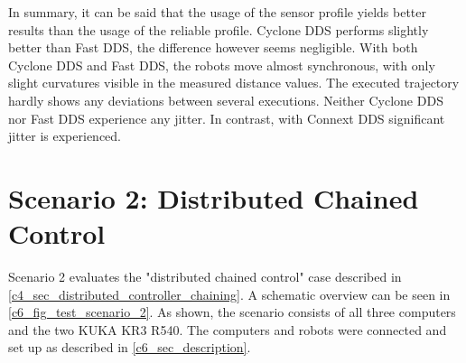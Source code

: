 In summary, it can be said that the usage of the sensor profile yields better results than the usage of the reliable profile. Cyclone DDS performs slightly better than Fast DDS, the difference however seems negligible. With both Cyclone DDS and Fast DDS, the robots move almost synchronous, with only slight curvatures visible in the measured distance values. The executed trajectory hardly shows any deviations between several executions. Neither Cyclone DDS nor Fast DDS experience any jitter. In contrast, with Connext DDS significant jitter is experienced.


\section{Scenario 2: Distributed Chained Control}
Scenario 2 evaluates the "distributed chained control" case described in \autoref{c4_sec_distributed_controller_chaining}. A schematic overview can be seen in \autoref{c6_fig_test_scenario_2}. As shown, the scenario consists of all three computers and the two KUKA KR3 R540. The computers and robots were connected and set up as described in \autoref{c6_sec_description}.

